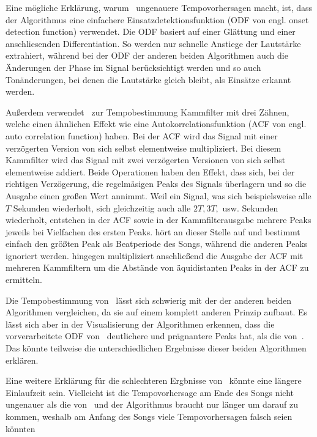 {{		%
		Eine mögliche Erklärung,
			warum~\cite{2001_BeatThis} ungenauere Tempovorhersagen macht,
			ist,
			dass der Algorithmus eine einfachere Einsatzdetektionsfunktion (ODF von engl. onset detection function) verwendet.
		Die ODF basiert auf einer Glättung und einer anschliesenden Differentiation.
		So werden nur schnelle Anstiege der Lautstärke extrahiert,
			während bei der ODF der anderen beiden Algorithmen auch die Änderungen der Phase im Signal berücksichtigt werden
			und so auch Tonänderungen,
			bei denen die Lautstärke gleich bleibt,
			als Einsätze erkannt werden.

		Außerdem verwendet~\cite{2001_BeatThis} zur Tempobestimmung Kammfilter mit drei Zähnen,
			welche einen ähnlichen Effekt wie eine Autokorrelationsfunktion (ACF von engl. auto correlation function) haben.
		Bei der ACF wird das Signal mit einer verzögerten Version von sich selbst elementweise multipliziert.
		Bei diesem Kammfilter wird das Signal mit zwei verzögerten Versionen von sich selbst elementweise addiert.
		Beide Operationen haben den Effekt,
			dass sich,
			bei der richtigen Verzögerung,
			die regelmäsigen Peaks des Signals überlagern
			und so die Ausgabe einen großen Wert annimmt.
		Weil ein Signal,
			was sich beispielsweise alle $T$ Sekunden wiederholt,
			sich gleichzeitig auch alle $2T, 3T,$ usw. Sekunden wiederholt,
			entstehen in der ACF sowie in der Kammfilterausgabe mehrere Peaks jeweils bei Vielfachen des ersten Peaks.
		\cite{2001_BeatThis} hört an dieser Stelle auf
			und bestimmt einfach den größten Peak als Beatperiode des Songs,
			während die anderen Peaks ignoriert werden.
		\cite{2009_DaPlSt} hingegen multipliziert anschließend die Ausgabe der ACF mit mehreren Kammfiltern
			um die Abstände von äquidistanten Peaks in der ACF zu ermitteln.

		Die Tempobestimmung von~\cite{2011_PlRoSt} lässt sich schwierig mit der der anderen beiden Algorithmen vergleichen,
			da sie auf einem komplett anderen Prinzip aufbaut.
		Es lässt sich aber in der Visualisierung der Algorithmen erkennen,
			dass die vorverarbeitete ODF von~\cite{2009_DaPlSt} deutlichere und prägnantere Peaks hat,
			als die von~\cite{2011_PlRoSt}.
		Das könnte teilweise die unterschiedlichen Ergebnisse dieser beiden Algorithmen erklären.

		Eine weitere Erklärung für die schlechteren Ergbnisse von~\cite{2011_PlRoSt} könnte eine längere Einlaufzeit sein.
		Vielleicht ist die Tempovorhersage am Ende des Songs nicht ungenauer als die von~\cite{2009_DaPlSt}
			und der Algorithmus braucht nur länger um darauf zu kommen,
			weshalb am Anfang des Songs viele Tempovorhersagen falsch seien könnten
	}
}

